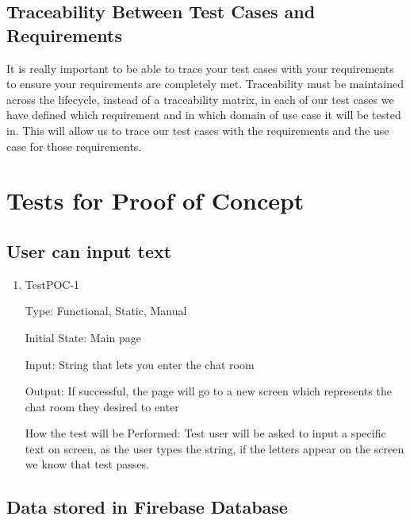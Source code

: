 \documentclass[12pt, titlepage]{article}
\begin{document}
\subsection{Traceability Between Test Cases and Requirements}
It is really important to be able to trace your test cases with your requirements to ensure your requirements are completely met. Traceability must be maintained across the lifecycle, instead of a traceability matrix, in each of our test cases we have defined which requirement and in which domain of use case it will be tested in. This will allow us to trace our test cases with the requirements and the use case for those requirements.


\section{Tests for Proof of Concept}

\subsection{User can input text}
		

\begin{enumerate}

\item{TestPOC-1\\}

Type: Functional, Static, Manual

Initial State: Main page

Input: String that lets you enter the chat room

Output: If successful, the page will go to a new screen which represents the chat room they desired to enter

How the test will be Performed: Test user will be asked to input a specific text on screen, as the user types the string, if the letters appear on the screen we know that test passes.

\end{enumerate}

\subsection{Data stored in Firebase Database}
\end{document}
